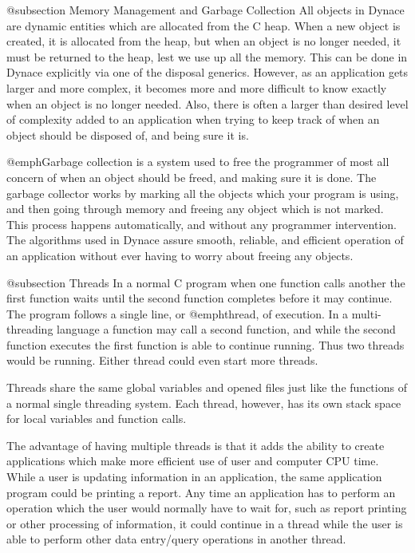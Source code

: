 @subsection Memory Management and Garbage Collection
All objects in Dynace are dynamic entities which are allocated from the C
heap.  When a new object is created, it is allocated from the heap, but
when an object is no longer needed, it must be returned to the heap,
lest we use up all the memory.  This can be done in Dynace explicitly via
one of the disposal generics.  However, as an application gets larger
and more complex, it becomes more and more difficult to know exactly
when an object is no longer needed.  Also, there is often a larger than
desired level of complexity added to an application when trying to keep
track of when an object should be disposed of, and being sure it is.

@emph{Garbage collection} is a system used to free the programmer of
most all concern of when an object should be freed, and making sure it
is done.  The garbage collector works by marking all the objects which
your program is using, and then going through memory and freeing any
object which is not marked.  This process happens automatically, and
without any programmer intervention.  The algorithms used in Dynace assure
smooth, reliable, and efficient operation of an application without
ever having to worry about freeing any objects.

@subsection Threads
In a normal C program when one function calls another the first function
waits until the second function completes before it may continue.  The
program follows a single line, or @emph{thread}, of execution.  In a
multi-threading language a function may call a second function, and
while the second function executes the first function is able to continue
running.  Thus two threads would be running.  Either thread could even
start more threads.

Threads share the same global variables and opened files just like the
functions of a normal single threading system.  Each thread, however,
has its own stack space for local variables and function calls.

The advantage of having multiple threads is that it adds the ability to
create applications which make more efficient use of user and computer
CPU time.  While a user is updating information in an application, the
same application program could be printing a report.  Any time an
application has to perform an operation which the user would normally
have to wait for, such as report printing or other processing of
information, it could continue in a thread while the user is able to
perform other data entry/query operations in another thread.

